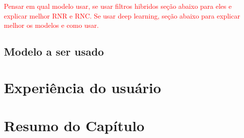 \textcolor{red}{Pensar em qual modelo usar, se usar filtros hibridos seção abaixo para eles e explicar melhor RNR e RNC.
Se usar deep learning, seção abaixo para explicar melhor os modelos e como usar.}

\subsection{Modelo a ser usado}\label{subsec:modeloaserusado}

\section{Experiência do usuário}\label{sec:expus}


\section{Resumo do Capítulo}\label{sec:resrefteor}
